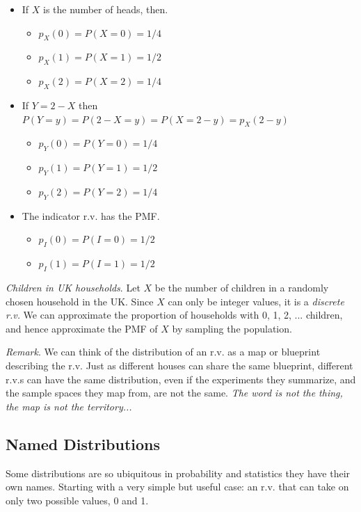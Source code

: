 \begin{itemize}
\item
  If \(X\) is the number of heads, then.
  \begin{itemize}
  \item
    \(p_{X}(0) = P(X = 0) = 1/4\)
  \item
    \(p_{X}(1) = P(X = 1) = 1/2\)
  \item
    \(p_{X}(2) = P(X = 2) = 1/4\)
  \end{itemize}
\item
  If \(Y = 2 - X\) then
  \(P(Y = y) = P(2 - X = y) = P(X = 2 - y) = p_{X}(2 - y)\)
  \begin{itemize}
  \item
    \(p_{Y}(0) = P(Y = 0) = 1/4\)
  \item
    \(p_{Y}(1) = P(Y = 1) = 1/2\)
  \item
    \(p_{Y}(2) = P(Y = 2) = 1/4\)
  \end{itemize}
\item
  The indicator r.v. has the PMF.
  \begin{itemize}
  \item
    \(p_{I}(0) = P(I = 0) = 1/2\)
  \item
    \(p_{I}(1) = P(I = 1) = 1/2\)
  \end{itemize}
\end{itemize}

\emph{Children in UK households}. 
Let \(X\) be the number of children in 
a randomly chosen household in the UK. 
Since \(X\) can only be integer values, 
it is a \emph{discrete r.v.} 
We can approximate the proportion
of households with 0, 1, 2, ... children, 
and hence approximate the PMF of \(X\) by sampling the population.

\emph{Remark}. 
We can think of the distribution of an r.v. as
a map or blueprint describing the r.v. 
Just as different houses can share the same blueprint, 
different r.v.s can have the same distribution, 
even if the experiments they summarize, 
and the sample spaces they map from, 
are not the same. 
\emph{The word is not the thing,
the map is not the territory...}

\subsection{Named Distributions}

Some distributions are so ubiquitous in probability and statistics they 
have their own names. 
Starting with a very simple but useful case: 
an r.v. that can take on only two possible values, 0 and 1.

